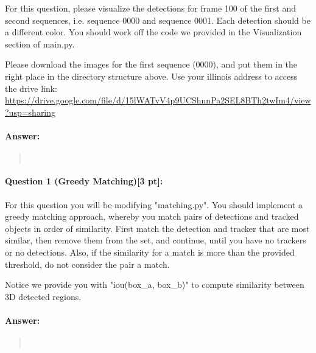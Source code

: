 \documentclass[11pt]{article}
\begin{document}
For this question, please visualize the detections for frame 100 of the first and second sequences, i.e. sequence 0000 and sequence 0001. Each detection should be a different color. You should work off the code we provided in the Visualization section of main.py.

Please download the images for the first sequence (0000), and put them in the right place in the directory structure above. Use your illinois address to access the drive link: \url{https://drive.google.com/file/d/15lWATvV4p9UCShnnPa2SEL8BTh2twIm4/view?usp=sharing}
\paragraph{Answer:} 
\begin{quote}



\begin{lstlisting}[language=Python, basicstyle=\scriptsize]



\end{lstlisting}



\end{quote}

\paragraph{Question 1 (Greedy Matching)[3 pt]:}
For this question you will be modifying "matching.py". You should implement a greedy matching approach, whereby you match pairs of detections and tracked objects in order of similarity. First match the detection and tracker that are most similar, then remove them from the set, and continue, until you have no trackers or no detections. Also, if the similarity for a match is more than the provided threshold, do not consider the pair a match.

Notice we provide you with "iou(box\_a, box\_b)" to compute similarity between 3D detected regions.
\paragraph{Answer:} 
\begin{quote}



\begin{lstlisting}[language=Python, basicstyle=\scriptsize]



\end{lstlisting}



\end{quote}
\end{document}
